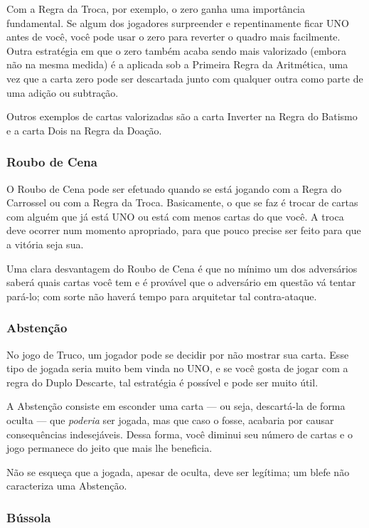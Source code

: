Com a Regra da Troca, por exemplo, o zero ganha uma importância fundamental. Se algum dos jogadores surpreender e repentinamente ficar UNO antes de você, você pode usar o zero para reverter o quadro mais facilmente. Outra estratégia em que o zero também acaba sendo mais valorizado (embora não na mesma medida) é a aplicada sob a Primeira Regra da Aritmética, uma vez que a carta zero pode ser descartada junto com qualquer outra como parte de uma adição ou subtração.

Outros exemplos de cartas valorizadas são a carta Inverter na Regra do Batismo e a carta Dois na Regra da Doação.

\subsubsection{Roubo de Cena}

O Roubo de Cena pode ser efetuado quando se está jogando com a Regra do Carrossel ou com a Regra da Troca. Basicamente, o que se faz é trocar de cartas com alguém que já está UNO ou está com menos cartas do que você. A troca deve ocorrer num momento apropriado, para que pouco precise ser feito para que a vitória seja sua.

Uma clara desvantagem do Roubo de Cena é que no mínimo um dos adversários saberá quais cartas você tem e é provável que o adversário em questão vá tentar pará-lo; com sorte não haverá tempo para arquitetar tal contra-ataque.

\subsubsection{Abstenção}

No jogo de Truco, um jogador pode se decidir por não mostrar sua carta. Esse tipo de jogada seria muito bem vinda no UNO, e se você gosta de jogar com a regra do Duplo Descarte, tal estratégia é possível e pode ser muito útil.

A Abstenção consiste em esconder uma carta --- ou seja, descartá-la de forma oculta --- que \emph{poderia} ser jogada, mas que caso o fosse, acabaria por causar consequências indesejáveis. Dessa forma, você diminui seu número de cartas e o jogo permanece do jeito que mais lhe beneficia.

Não se esqueça que a jogada, apesar de oculta, deve ser legítima; um blefe não caracteriza uma Abstenção.

\subsubsection{Bússola}


